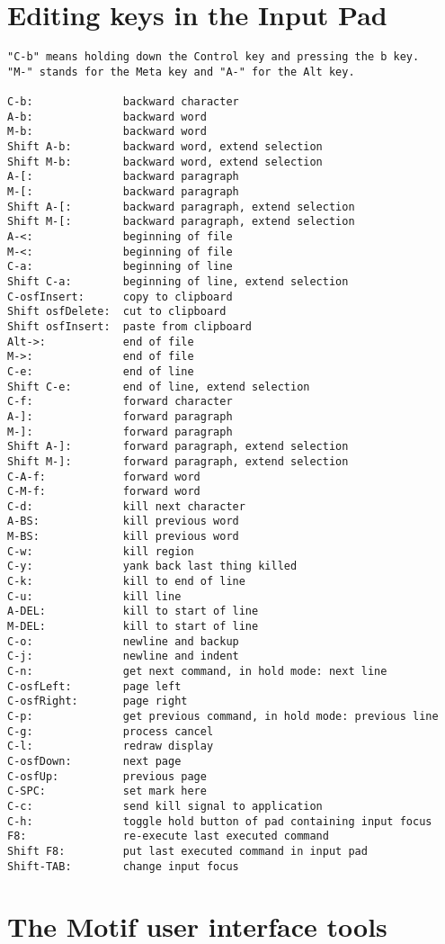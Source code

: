\documentclass[11pt]{cernman}
\newcommand{\MOTIF}{{\sf Motif}\index{Motif}}
\newcommand{\IP}{{\bf Input Pad}\index{Input Pad}}
\begin{document}
\chapter{Editing keys in the \IP}
\begin{verbatim}
"C-b" means holding down the Control key and pressing the b key.
"M-" stands for the Meta key and "A-" for the Alt key.

C-b:              backward character
A-b:              backward word
M-b:              backward word
Shift A-b:        backward word, extend selection
Shift M-b:        backward word, extend selection
A-[:              backward paragraph
M-[:              backward paragraph
Shift A-[:        backward paragraph, extend selection
Shift M-[:        backward paragraph, extend selection
A-<:              beginning of file
M-<:              beginning of file
C-a:              beginning of line
Shift C-a:        beginning of line, extend selection
C-osfInsert:      copy to clipboard
Shift osfDelete:  cut to clipboard
Shift osfInsert:  paste from clipboard
Alt->:            end of file
M->:              end of file
C-e:              end of line
Shift C-e:        end of line, extend selection
C-f:              forward character
A-]:              forward paragraph
M-]:              forward paragraph
Shift A-]:        forward paragraph, extend selection
Shift M-]:        forward paragraph, extend selection
C-A-f:            forward word
C-M-f:            forward word
C-d:              kill next character
A-BS:             kill previous word
M-BS:             kill previous word
C-w:              kill region
C-y:              yank back last thing killed
C-k:              kill to end of line
C-u:              kill line
A-DEL:            kill to start of line
M-DEL:            kill to start of line
C-o:              newline and backup
C-j:              newline and indent
C-n:              get next command, in hold mode: next line
C-osfLeft:        page left
C-osfRight:       page right
C-p:              get previous command, in hold mode: previous line
C-g:              process cancel
C-l:              redraw display
C-osfDown:        next page
C-osfUp:          previous page
C-SPC:            set mark here
C-c:              send kill signal to application
C-h:              toggle hold button of pad containing input focus
F8:               re-execute last executed command
Shift F8:         put last executed command in input pad
Shift-TAB:        change input focus
\end{verbatim}

\chapter{The \MOTIF{} user interface tools}
\end{document}
